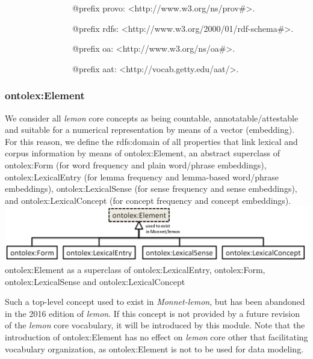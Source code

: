 \documentclass[a4paper]{article}
\newcommand\textstyleEmphasis[1]{\textit{#1}}
\newcommand\textstyleSourceText[1]{\textrm{#1}}
\begin{document}
\textstyleSourceText{\ \ \ \ \ \ \ \ \ \ \ \ \ \ \ \ @prefix provo: {\textless}http://www.w3.org/ns/prov\#{\textgreater}.}

\textstyleSourceText{\ \ \ \ \ \ \ \ \ \ \ \ \ \ \ \ @prefix rdfs: {\textless}http://www.w3.org/2000/01/rdf-schema\#{\textgreater}.}

\textstyleSourceText{\ \ \ \ \ \ \ \ \ \ \ \ \ \ \ \ @prefix oa: {\textless}http://www.w3.org/ns/oa\#{\textgreater}.}

\textstyleSourceText{\ \ \ \ \ \ \ \ \ \ \ \ \ \ \ \ @prefix aat: {\textless}http://vocab.getty.edu/aat/{\textgreater}.}


\bigskip

\subsubsection{ontolex:Element }
We consider all \textstyleEmphasis{lemon} core concepts as being countable, annotatable/attestable and suitable for a numerical representation by means of a vector (embedding). For this reason, we define the rdfs:domain of all properties that link lexical and corpus information by means of ontolex:Element, an abstract superclass of ontolex:Form (for word frequency and plain word/phrase embeddings), ontolex:LexicalEntry (for lemma frequency and lemma-based word/phrase embeddings), ontolex:LexicalSense (for sense frequency and sense embeddings), and ontolex:LexicalConcept (for concept frequency and concept embeddings).  \includegraphics{index-img/index-img001.png} ontolex:Element as a superclass of ontolex:LexicalEntry, ontolex:Form, ontolex:LexicalSense and ontolex:LexicalConcept 

Such a top-level concept used to exist in \textstyleEmphasis{Monnet-lemon}, but has been abandoned in the 2016 edition of \textstyleEmphasis{lemon}. If this concept is not provided by a future revision of the \textstyleEmphasis{lemon} core vocabulary, it will be introduced by this module. Note that the introduction of ontolex:Element has no effect on \textstyleEmphasis{lemon} core other that facilitating vocabulary organization, as ontolex:Element is not to be used for data modeling.
\end{document}
